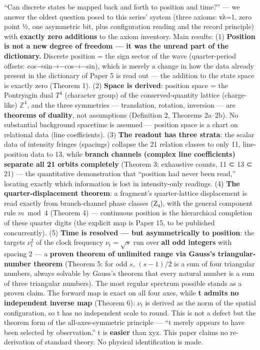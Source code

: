 \documentclass[
]{ltjsarticle}
\begin{document}
``Can discrete states be mapped back and forth to position and time?''
--- we answer the oldest question posed to this series' system (three
axioms: νλ=1, zero point ½, one asymmetric bit, plus configuration
reading and the record principle) with \textbf{exactly zero additions}
to the axiom inventory. Main results: (1) \textbf{Position is not a new
degree of freedom --- it was the unread part of the dictionary.}
Discrete position = the sign sector of the wave (quarter-period offsets:
cos→sin→−cos→−sin), which is merely a change in how the data already
present in the dictionary of Paper 5 is read out --- the addition to the
state space is exactly zero (Theorem 1). (2) \textbf{Space is derived}:
position space = the Pontryagin dual \(T^4\) (character group) of the
conserved-quantity lattice (charge-like) \(\mathbb{Z}^4\), and the three
symmetries --- translation, rotation, inversion --- are \textbf{theorems
of duality}, not assumptions (Definition 2, Theorems 2a--2b). No
substantial background spacetime is assumed --- position space is a
chart on relational data (line coefficients). (3) \textbf{The readout
has three strata}: the scalar data of intensity fringes (spacings)
collapse the 21 relation classes to only 11, line-position data to 13,
while \textbf{branch channels (complex line coefficients) separate all
21 orbits completely} (Theorem 3; exhaustive counts, 11 ⊂ 13 ⊂ 21) ---
the quantitative demonstration that ``position had never been read,''
locating exactly which information is lost in intensity-only readings.
(4) \textbf{The quarter-displacement theorem}: a fragment's
quarter-lattice displacement is read exactly from branch-channel phase
classes (Z₄), with the general component rule \(m\bmod4\) (Theorem 4)
--- continuous position is the hierarchical completion of these quarter
digits (the explicit map is Paper 15, to be published concurrently). (5)
\textbf{Time is resolved --- but asymmetrically to position}: the
targets \(\nu_t^2\) of the clock frequency \(\nu_t=\sqrt{s}\) run over
\textbf{all odd integers} with spacing 2 --- a \textbf{proven theorem of
unlimited range via Gauss's triangular-number theorem} (Theorem 5: for
odd \(s\), \((s-1)/2\) is a sum of four triangular numbers, always
solvable by Gauss's theorem that every natural number is a sum of three
triangular numbers). The most regular spectrum possible stands as a
proven claim. The forward map is exact on all four axes, while \textbf{t
admits no independent inverse map} (Theorem 6): \(\nu_t\) is derived as
the norm of the spatial configuration, so t has no independent scale to
round. This is not a defect but the theorem form of the
all-axes-symmetric principle --- ``t merely appears to have been
selected by observation.'' t is \textbf{easier} than xyz. This paper
claims no re-derivation of standard theory. No physical identification
is made.
\end{document}
